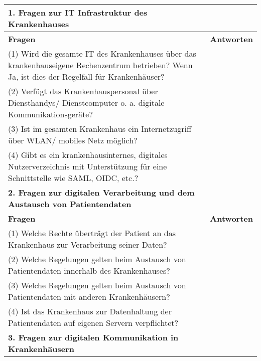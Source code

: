 \begin{longtable}{p{12cm}|p{3cm}}
  \hline
  \textbf{1. Fragen zur IT Infrastruktur des Krankenhauses}                                                                                                  \\ \hline
  \endfirsthead
  \textbf{Fragen}                                                                                                                                           &   \textbf{Antworten}   \\ \hline
(1) Wird die gesamte IT des Krankenhauses über das krankenhauseigene Rechenzentrum betrieben?  Wenn Ja, ist dies der Regelfall für Krankenhäuser? &     \\ \hline
(2) Verfügt das Krankenhauspersonal über Diensthandys/ Dienstcomputer o. a. digitale Kommunikationsgeräte?                                         &          \\ \hline
(3) Ist im gesamten Krankenhaus ein Internetzugriff über WLAN/ mobiles Netz möglich?                                                               &       \\ \hline
(4) Gibt es ein krankenhausinternes, digitales Nutzerverzeichnis mit Unterstützung für eine Schnittstelle wie SAML, OIDC, etc.?                   &          \\ \hline
  \hline
  \textbf{2. Fragen zur digitalen Verarbeitung und dem Austausch von Patientendaten}                                                                                                  \\ \hline
  \textbf{Fragen}                                                                                                                                           &   \textbf{Antworten}   \\ \hline
(1) Welche Rechte überträgt der Patient an das Krankenhaus zur Verarbeitung seiner Daten? &     \\ \hline
(2) Welche Regelungen gelten beim Austausch von Patientendaten innerhalb des Krankenhauses?                                       &          \\ \hline
(3) Welche Regelungen gelten beim Austausch von Patientendaten mit anderen Krankenhäusern?                                                             &       \\ \hline
(4) Ist das Krankenhaus zur Datenhaltung der Patientendaten auf eigenen Servern verpflichtet?                  &          \\ \hline
\hline
\textbf{3. Fragen zur digitalen Kommunikation in Krankenhäusern}                                                                                                  \\ \hline

\end{longtable}
